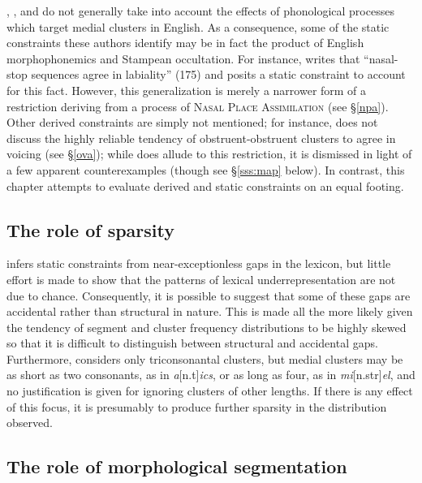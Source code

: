 \citeauthor{Duanmu2009}, \citeauthor{Hammond1999a}, and \citeauthor{Pierrehumbert1994} do not generally take into account the effects of phonological processes which target medial clusters in English.
As a consequence, some of the static constraints these authors identify may be in fact the product of English morphophonemics and Stampean occultation. 
For instance, \citeauthor{Pierrehumbert1994} writes that ``nasal-stop sequences agree in labiality'' (175) and posits a static constraint to account for this fact.
However, this generalization is merely a narrower form of a restriction deriving from a process of \textsc{Nasal Place Assimilation} (see \S\ref{npa}).
Other derived constraints are simply not mentioned; for instance, \citeauthor{Pierrehumbert1994} does not discuss the highly reliable tendency of obstruent-obstruent clusters to agree in voicing (see \S\ref{ova}); while \citet{Hammond1999a} does allude to this restriction, it is dismissed in light of a few apparent counterexamples (though see \S\ref{sss:map} below).
In contrast, this chapter attempts to evaluate derived and static constraints on an equal footing.

\subsection{The role of sparsity}

\citet{Pierrehumbert1994} infers static constraints from near-exceptionless gaps in the lexicon, but little effort is made to show that the patterns of lexical underrepresentation are not due to chance. 
Consequently, it is possible to suggest that some of these gaps are accidental rather than structural in nature.
This is made all the more likely given the tendency of segment and cluster frequency distributions to be highly skewed \citep[e.g.,][]{Pande2010,Sigurd1968,Tambovtsev2007,Weiss1961} so that it is difficult to distinguish between structural and accidental gaps.
Furthermore, \citeauthor{Pierrehumbert1994} considers only triconsonantal clusters, but medial clusters may be as short as two consonants, as in \emph{a}[n.t]\emph{ics}, or as long as four, as in \emph{mi}[n.str]\emph{el}, and no justification is given for ignoring clusters of other lengths.
If there is any effect of this focus, it is presumably to produce further sparsity in the distribution observed.

\subsection{The role of morphological segmentation}

